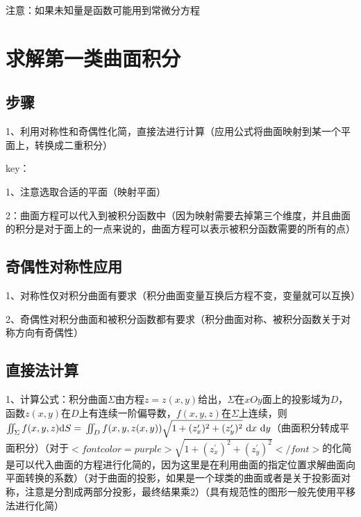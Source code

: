 注意：如果未知量是函数可能用到常微分方程

\section{求解第一类曲面积分}



\subsection{步骤}

1、利用对称性和奇偶性化简，直接法进行计算（应用公式将曲面映射到某一个平面上，转换成二重积分）

key：

1、注意选取合适的平面（映射平面）

2：曲面方程可以代入到被积分函数中（因为映射需要去掉第三个维度，并且曲面的积分是对于面上的一点来说的，曲面方程可以表示被积分函数需要的所有的点）



\subsection{奇偶性对称性应用}

1、对称性仅对积分曲面有要求（积分曲面变量互换后方程不变，变量就可以互换）

2、奇偶性对积分曲面和被积分函数都有要求（积分曲面对称、被积分函数关于对称方向有奇偶性）



\subsection{直接法计算}

1、计算公式：积分曲面$ \Sigma $由方程$ z=z(x, y) $给出，$ \Sigma $在$ x O y $面上的投影域为$ D $，函数$ z(x, y) $在$ D $上有连续一阶偏导数，$ f(x, y, z) $在$ \Sigma $上连续，则$ \iint_{\Sigma} f(x, y, z) \mathrm{d} S=\newline\iint_{D} f(x, y, z(x, y)) \sqrt{1+(z_{x}^{\prime})^{2}+(z_{y}^{\prime})^{2}} \mathrm{~d} x \mathrm{~d} y $（曲面积分转成平面积分）（对于$ <font color=purple>\sqrt{1+\left(z_{x}^{\prime}\right)^{2}+\left(z_{y}^{\prime}\right)^{2}}</font> $的化简是可以代入曲面的方程进行化简的，因为这里是在利用曲面的指定位置求解曲面向平面转换的系数）（对于曲面的投影，如果是一个球类的曲面或者是关于投影面对称，注意是分割成两部分投影，最终结果乘2）（具有规范性的图形一般先使用平移法进行化简）



